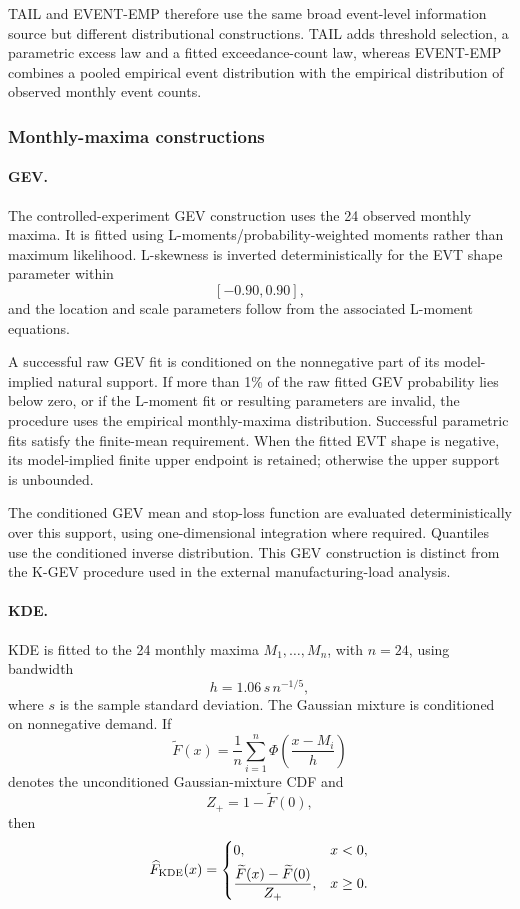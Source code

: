 \documentclass[]{interact}
\begin{document}
TAIL and EVENT-EMP therefore use the same broad event-level
information source but different distributional constructions. TAIL
adds threshold selection, a parametric excess law and a fitted
exceedance-count law, whereas EVENT-EMP combines a pooled empirical
event distribution with the empirical distribution of observed
monthly event counts.


\subsubsection*{Monthly-maxima constructions}

\paragraph*{GEV.}

The controlled-experiment GEV construction uses the 24 observed
monthly maxima. It is fitted using L-moments/probability-weighted
moments rather than maximum likelihood. L-skewness is inverted
deterministically for the EVT shape parameter within
\[
[-0.90,0.90],
\]
and the location and scale parameters follow from the associated
L-moment equations.

A successful raw GEV fit is conditioned on the nonnegative part of its
model-implied natural support. If more than 1\% of the raw fitted GEV
probability lies below zero, or if the L-moment fit or resulting
parameters are invalid, the procedure uses the empirical
monthly-maxima distribution. Successful parametric fits satisfy the
finite-mean requirement. When the fitted EVT shape is negative, its
model-implied finite upper endpoint is retained; otherwise the upper
support is unbounded.

The conditioned GEV mean and stop-loss function are evaluated
deterministically over this support, using one-dimensional integration
where required. Quantiles use the conditioned inverse distribution.
This GEV construction is distinct from the K-GEV procedure used in the
external manufacturing-load analysis.


\paragraph*{KDE.}

KDE is fitted to the 24 monthly maxima
\(M_1,\ldots,M_n\), with \(n=24\), using bandwidth
\[
h
=
1.06\,s\,n^{-1/5},
\]
where \(s\) is the sample standard deviation. The Gaussian mixture is
conditioned on nonnegative demand. If
\[
\widetilde F(x)
=
\frac{1}{n}
\sum_{i=1}^{n}
\Phi\left(\frac{x-M_i}{h}\right)
\]
denotes the unconditioned Gaussian-mixture CDF and
\[
Z_+
=
1-\widetilde F(0),
\]
then
\[
\widehat F_{\rm KDE}(x)
=
\begin{cases}
0,
&
x<0,
\\[3pt]
\dfrac{\widetilde F(x)-\widetilde F(0)}{Z_+},
&
x\geq0.
\end{cases}
\]
\end{document}
